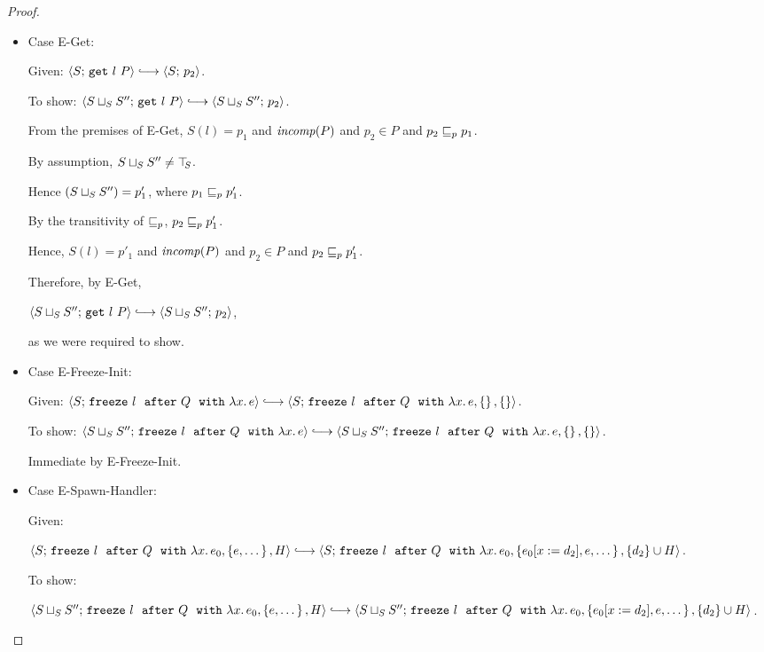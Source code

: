 \begin{proof}
\begin{itemize}
    \item Case {\sc E-Get}:

      Given: $\config{S}{\getexp{l}{P}} \parstepsto \config{S}{p_2}$.

      To show: $\config{\lubstore{S}{S''}}{\getexp{l}{P}} \parstepsto
      \config{\lubstore{S}{S''}}{p_2}$.

      From the premises of {\sc E-Get}, $S(l) = p_1$ and $\mathit{incomp}(P)$
      and $p_2 \in P$ and $p_2 \sqsubseteq_p p_1$.

      By assumption, $S \sqcup_{S} S'' \neq \top\hspace{-0.85mm}_{S}$.

      Hence $(S \sqcup_{S} S'') = p'_1$, where $p_1 \sqsubseteq_p p'_1$.

      By the transitivity of $\sqsubseteq_p$, $p_2 \sqsubseteq_p p'_1$.

      Hence, $S(l) = p'_1$ and $\mathit{incomp}(P)$ and $p_2 \in P$ and $p_2
      \sqsubseteq_p p'_1$.

      Therefore, by {\sc E-Get},

      $\config{\lubstore{S}{S''}}{\getexp{l}{P}} \parstepsto
      \config{\lubstore{S}{S''}}{p_2}$,

      as we were required to show.

    \item Case {\sc E-Freeze-Init}:

      Given: $\config{S}{\freezeafter{l}{Q}{\lam{x}{e}}} \parstepsto
      \config{S}{\freezeafterfull{l}{Q}{\lam{x}{e}}{\setof{}}{\setof{}}}$.

      To show:
      $\config{\lubstore{S}{S''}}{\freezeafter{l}{Q}{\lam{x}{e}}}
      \parstepsto
      \config{\lubstore{S}{S''}}{\freezeafterfull{l}{Q}{\lam{x}{e}}{\setof{}}{\setof{}}}$.

      Immediate by {\sc E-Freeze-Init}.

    \item Case {\sc E-Spawn-Handler}:

      Given:

      $\config{S}{\freezeafterfull{l}{Q}{\lam{x}{e_0}}{\setof{e,
            \dots}}{H}} \parstepsto
      \config{S}{\freezeafterfull{l}{Q}{\lam{x}{e_0}}{\setof{\subst{e_0}{x}{d_2},
            e, \dots}} {\{d_2\}\cup H}}$.

      To show:

      $\config{\lubstore{S}{S''}}{\freezeafterfull{l}{Q}{\lam{x}{e_0}}{\setof{e,
            \dots}}{H}} \parstepsto
      \config{\lubstore{S}{S''}}{\freezeafterfull{l}{Q}{\lam{x}{e_0}}{\setof{\subst{e_0}{x}{d_2},
            e, \dots}} {\{d_2\}\cup H}}$.


\end{itemize}
\end{proof}
